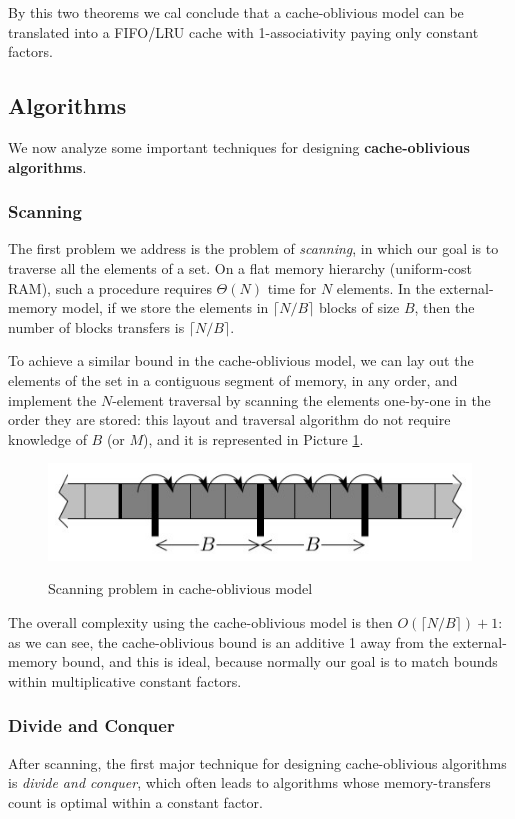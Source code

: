 By this two theorems we cal conclude that a cache-oblivious model can be translated into a FIFO/LRU cache with 1-associativity paying only constant factors.

\subsection{Algorithms}
We now analyze some important techniques for designing \textbf{cache-oblivious algorithms}.

\subsubsection{Scanning}
The first problem we address is the problem of \textit{scanning}, in which our goal is to traverse all the elements of a set. On a flat memory hierarchy (uniform-cost RAM), such a procedure requires $\Theta(N)$ time for $N$ elements. In the external-memory model, if we store the elements in $\lceil N/B \rceil$ blocks of size $B$, then the number of blocks transfers is $\lceil N/B \rceil$.

To achieve a similar bound in the cache-oblivious model, we can lay out the elements of the set in a contiguous segment of memory, in any order, and implement the $N$-element traversal by scanning the elements one-by-one in the order they are stored: this layout and traversal algorithm do not require knowledge of $B$ (or $M$), and it is represented in Picture \ref{scanning}.

\begin{figure}[h!]
		\centering
		\includegraphics[scale = 1.2]{img/scanning.jpg}
        \label{scanning}
        \caption{Scanning problem in cache-oblivious model}
\end{figure}

The overall complexity using the cache-oblivious model is then $O(\lceil N/B \rceil) + 1$: as we can see, the cache-oblivious bound is an additive 1 away from the external-memory bound, and this is ideal, because normally our goal is to match bounds within multiplicative constant factors.

\subsubsection{Divide and Conquer}
After scanning, the first major technique for designing cache-oblivious algorithms is \textit{divide and conquer}, which often leads to algorithms whose memory-transfers count is optimal within a constant factor. 

